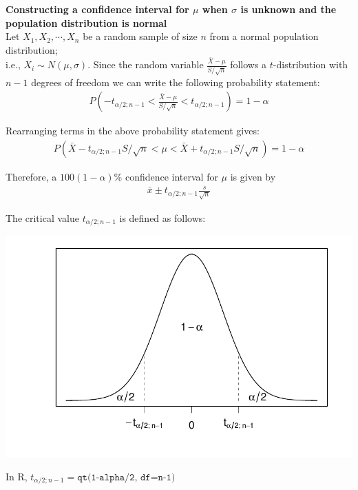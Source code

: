 \documentclass[fleqn, 12pt]{article}\usepackage[]{graphicx}\usepackage[]{color}
\makeatletter
\def\maxwidth{ %
  \ifdim\Gin@nat@width>\linewidth
    \linewidth
  \else
    \Gin@nat@width
  \fi
}
\newenvironment{knitrout}{}{} %
\makeatother
\begin{document}
\textbf{Constructing a confidence interval for $\mu$ when $\sigma$ is unknown and the population distribution is normal}\\

Let $X_1, X_2, \cdots, X_n$ be a random sample of size $n$ from a normal population distribution;\\ i.e., $X_i \sim N(\mu, \sigma)$.  Since the random variable $\frac{\bar{X} - \mu}{S / \sqrt{n}}$ follows a $t$-distribution with $n-1$ degrees of freedom we can write the following probability statement:
\begin{align*}
P \left( -t_{\alpha/2; n-1} < \frac{\bar{X} - \mu}{S / \sqrt{n}} < t_{\alpha/2; n-1} \right) = 1 - \alpha
\end{align*}

Rearranging terms in the above probability statement gives:
\begin{align*}
P(\bar{X} - t_{\alpha/2; n-1} S / \sqrt{n} < \mu < \bar{X} + t_{\alpha/2; n-1} S / \sqrt{n}) = 1-\alpha
\end{align*}

Therefore, a $100(1-\alpha)$\% confidence interval for $\mu$ is given by
\begin{align*}
\bar{x} \pm t_{\alpha/2; n-1} \frac{s}{\sqrt{n}}
\end{align*}

The critical value $t_{\alpha/2; n-1}$ is defined as follows:

\begin{knitrout}
\color{fgcolor}
\includegraphics[width=\maxwidth]{figure/unnamed-chunk-3-1} 
\end{knitrout}

In R, $t_{\alpha/2;n-1} = \texttt{qt(1-alpha/2, df=n-1)}$\\
\end{document}
